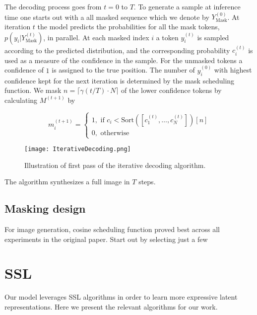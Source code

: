 \documentclass[../../thesis.tex]{subfiles}
\begin{document}
The decoding process goes from $t = 0$ to $T$. To generate a sample at inference time one starts out with a all masked sequence which we denote by $Y_\text{Mask}^{(0)}$. At iteration $t$ the model predicts the probabilities for all the mask tokens, $p(y_i|Y_\text{Mask}^{(t)})$, in parallel. At each masked index $i$ a token $y_i^{(t)}$ is sampled according to the predicted distribution, and the corresponding probability $c_i^{(t)}$ is used as a measure of the confidence in the sample. For the unmasked tokens a confidence of $1$ is assigned to the true position. The number of $y_i^{(0)}$ with highest confidence kept for the next iteration is determined by the mask scheduling function. We mask $n = \lceil \gamma(t/T)\cdot N \rceil$ of the lower confidence tokens by calculating $M^{(t+1)}$ by 

\begin{equation}
    m_i^{(t+1)} = 
    \begin{cases}
        1, \text{ if } c_i < \text{Sort}([c_1^{(t)},\dots,c_N^{(t)}])[n]\\
        0, \text{ otherwise} 
    \end{cases}
\end{equation}
\begin{figure}[h]
    \texttt{[image: IterativeDecoding.png]}
    \centering 
    \label{fig:IterativeDecoding}
    \caption{Illustration of first pass of the iterative decoding algorithm.}
\end{figure}

The algorithm synthesizes a full image in $T$ steps.  


\subsection{Masking design}

For image generation, cosine scheduling function proved best across all experiments in the original paper. Start out by selecting just a few 




\section{SSL}

Our model leverages SSL algorithms in order to learn more expressive latent representations. Here we present the relevant algorithms for our work. 

\end{document}
